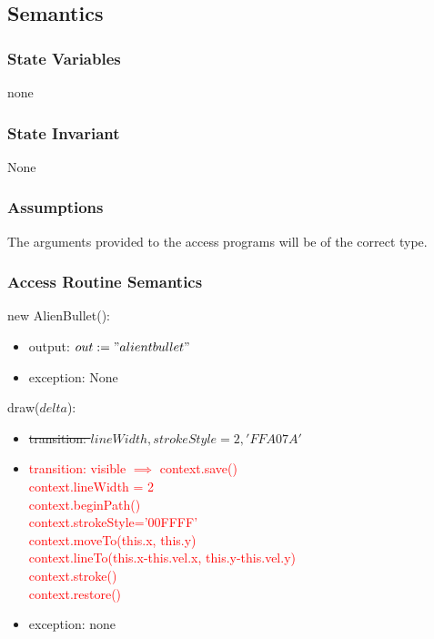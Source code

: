 \documentclass[12pt]{article}
\begin{document}
\subsection* {Semantics}

\subsubsection* {State Variables}
none
\subsubsection* {State Invariant}
None

\subsubsection* {Assumptions}

The arguments provided to the access programs will be of the correct type.

\subsubsection* {Access Routine Semantics}

\noindent new AlienBullet():
\begin{itemize}
\item output: $out := "alientbullet"$
\item exception: None
\end{itemize}

\noindent draw(\sout{$delta$}):
\begin{itemize}
\item \sout{transition: $lineWidth,strokeStyle = 2, 'FFA07A'$}
\item \textcolor{red}{transition: visible $\implies$ context.save()\\
				context.lineWidth = 2\\context.beginPath()\\
				context.strokeStyle='00FFFF'\\context.moveTo(this.x, this.y)\\
				context.lineTo(this.x-this.vel.x, this.y-this.vel.y)\\
				context.stroke()\\context.restore()}
\item exception: none
\end{itemize}

\newpage
\end{document}
